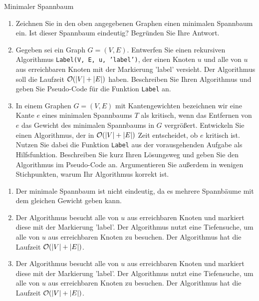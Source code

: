 \documentclass{article}
\begin{document}
\begin{exercise}{Minimaler Spannbaum}
  
  \begin{enumerate}
    \item Zeichnen Sie in den oben angegebenen Graphen einen minimalen Spannbaum ein. Ist dieser Spannbaum eindeutig? Begründen Sie Ihre Antwort.
    \item Gegeben sei ein Graph $G = (V,E)$. Entwerfen Sie einen rekursiven Algorithmus \texttt{Label(V, E, u, ’label’)}, der einen Knoten $u$ und alle von $u$ aus erreichbaren Knoten mit der Markierung ’label’ versieht. Der Algorithmus soll die Laufzeit $\mathcal{O}(|V| + |E|)$ haben. Beschreiben Sie Ihren Algorithmus und geben Sie Pseudo-Code für die Funktion \texttt{Label} an.
    \item In einem Graphen $G = (V,E)$ mit Kantengewichten bezeichnen wir eine Kante $e$ eines minimalen Spannbaums $T$ als kritisch, wenn das Entfernen von $e$ das Gewicht des minimalen Spannbaums in $G$ vergrößert. Entwickeln Sie einen Algorithmus, der in $\mathcal{O}(|V| + |E|)$ Zeit entscheidet, ob $e$ kritisch ist. Nutzen Sie dabei die Funktion \texttt{Label} aus der vorausgehenden Aufgabe als Hilfsfunktion. Beschreiben Sie kurz Ihren Lösungsweg und geben Sie den Algorithmus im Pseudo-Code an. Argumentieren Sie außerdem in wenigen Stichpunkten, warum Ihr Algorithmus korrekt ist.
  \end{enumerate}

  \begin{solution}
    \begin{enumerate}
      \item  Der minimale Spannbaum ist nicht eindeutig, da es mehrere Spannbäume mit dem gleichen Gewicht geben kann.
      \item Der Algorithmus besucht alle von $u$ aus erreichbaren Knoten und markiert diese mit der Markierung ’label’. Der Algorithmus nutzt eine Tiefensuche, um alle von $u$ aus erreichbaren Knoten zu besuchen. Der Algorithmus hat die Laufzeit $\mathcal{O}(|V| + |E|)$.
      \item Der Algorithmus besucht alle von $u$ aus erreichbaren Knoten und markiert diese mit der Markierung ’label’. Der Algorithmus nutzt eine Tiefensuche, um alle von $u$ aus erreichbaren Knoten zu besuchen. Der Algorithmus hat die Laufzeit $\mathcal{O}(|V| + |E|)$.
    \end{enumerate}
  \end{solution}
\end{exercise}
\end{document}
